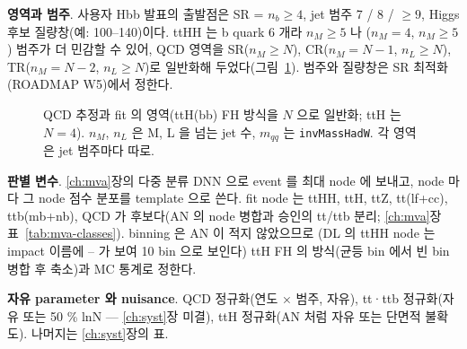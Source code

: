 \textbf{영역과 범주}. 사용자 Hbb 발표의 출발점은 SR = $n_b\ge4$, jet 범주 7 / 8 / $\ge9$, Higgs 후보 질량창(예: 100--140\GeV)이다.
ttHH 는 b quark 6 개라 $n_M\ge5$ 나 ($n_M=4$, $n_M\ge5$) 범주가 더 민감할 수 있어, QCD 영역을 SR($n_M\ge N$), CR($n_M=N-1$, $n_L\ge N$), TR($n_M=N-2$, $n_L\ge N$)로
일반화해 두었다(그림~\ref{fig:stats-regions}). 범주와 질량창은 SR 최적화(ROADMAP W5)에서 정한다.

\begin{figure}[htbp]
\centering
{}
\caption{QCD 추정과 fit 의 영역(ttH(bb) FH 방식을 $N$ 으로 일반화; ttH 는 $N=4$). $n_M$, $n_L$ 은 M, L 을 넘는 jet 수, $m_{qq}$ 는 \texttt{invMassHadW}. 각 영역은 jet 범주마다 따로.}
\label{fig:stats-regions}
\end{figure}

\textbf{판별 변수}. \ref{ch:mva}장의 다중 분류 DNN 으로 event 를 최대 node 에 보내고, node 마다 그 node 점수 분포를 template 으로 쓴다. fit node 는 ttHH, ttH, ttZ,
tt(lf+cc), ttb(mb+nb), QCD 가 후보다(AN 의 node 병합과 승인의 tt/ttb 분리; \ref{ch:mva}장 표~\ref{tab:mva-classes}). binning 은 AN 이 적지 않았으므로
(DL 의 ttHH node 는 impact 이름에 – 가 보여 10 bin 으로 보인다) ttH FH 의 방식(균등 bin 에서
빈 bin 병합 후 축소)과 MC 통계로 정한다.

\textbf{자유 parameter 와 nuisance}. QCD 정규화(연도 × 범주, 자유), tt·ttb 정규화(자유 또는 50 \% lnN — \ref{ch:syst}장 미결), ttH 정규화(AN 처럼 자유 또는
단면적 불확도). 나머지는 \ref{ch:syst}장의 표.

